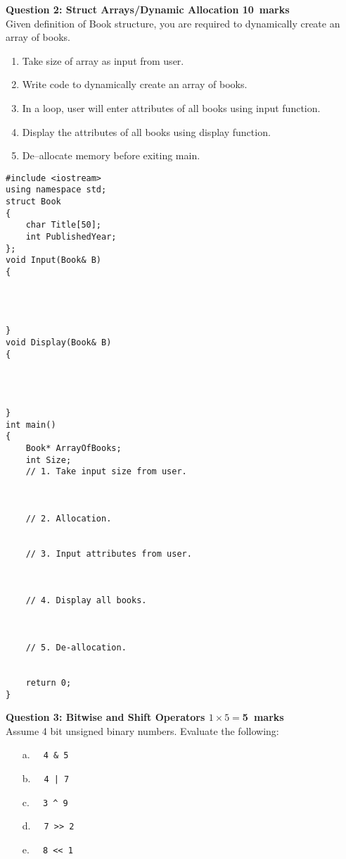 \documentclass[12pt,a4paper]{article}
\def\Qtwo{10}
\def\Qthree{5}
\begin{document}
\noindent\textbf{Question 2: Struct Arrays/Dynamic Allocation \hfill \Qtwo~marks}\\
Given definition of Book structure, you are required to dynamically create an array of books.
\begin{enumerate}
\item Take size of array as input from user.
\item Write code to dynamically create an array of books.
\item In a loop, user will enter attributes of all books using input function.
\item Display the attributes of all books using display function.
\item De--allocate memory before exiting main.
\end{enumerate}
\begin{lstlisting}
#include <iostream>
using namespace std;
struct Book
{
	char Title[50];
	int PublishedYear;
};
void Input(Book& B)
{




}
void Display(Book& B)
{




}
int main()
{
	Book* ArrayOfBooks;
	int Size;
	// 1. Take input size from user.
		
		
	
	// 2. Allocation.
		
	
	// 3. Input attributes from user.
		
	
	
	// 4. Display all books.
		
	
		
	// 5. De-allocation.
		
	
	return 0;
}
\end{lstlisting}

\noindent\textbf{Question 3: Bitwise and Shift Operators \hfill $1\times 5=$\Qthree~marks}\\
Assume 4 bit unsigned binary numbers. Evaluate the following:
\begin{enumerate}
\item[a.] \verb|  4 & 5|
\item[b.] \verb$  4 | 7$
\item[c.] \verb|  3 ^ 9|
\item[d.] \verb|  7 >> 2|
\item[e.] \verb|  8 << 1|
\end{enumerate}
\begin{figure}[H]
\end{figure}
\end{document}
